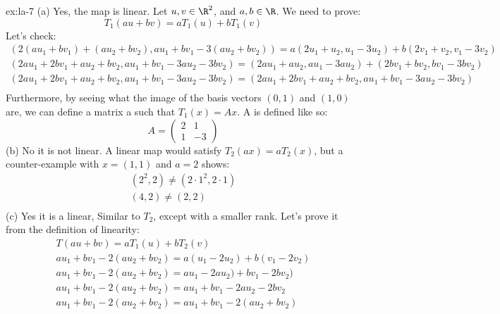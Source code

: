 \begin{solution}{ex:la-7}
  (a) Yes, the map is linear. Let $u,v\in \R^2$, and $a,b\in \R$. We need to prove:
  \[
    T_1(au+bv)=aT_1(u)+bT_1(v)
  \]
  Let's check:
  \[
    \begin{gathered}
      (2(au_1+bv_1)+(au_2+bv_2),au_1+bv_1-3(au_2+bv_2))=a(2u_1+u_2,u_1-3u_2)+b(2v_1+v_2,v_1-3v_2)\\
      (2au_1+2bv_1+au_2+bv_2,au_1+bv_1-3au_2-3bv_2)=(2au_1+au_2,au_1-3au_2)+(2bv_1+bv_2,bv_1-3bv_2)\\
      (2au_1+2bv_1+au_2+bv_2,au_1+bv_1-3au_2-3bv_2)=(2au_1+2bv_1+au_2+bv_2,au_1+bv_1-3au_2-3bv_2)\\
    \end{gathered}
  \]
  Furthermore, by seeing what the image of the basis vectors $(0,1)$ and $(1,0)$ are, we can define a matrix a such that $T_1(x)=Ax$. A is defined like so:
  \[
    A=\begin{pmatrix}2&1\\1&-3\end{pmatrix}
  \]
  (b)
  No it is not linear. A linear map would satisfy $T_2(ax)=aT_2(x)$, but a counter-example with $x=(1,1)$ and $a=2$ shows:
  \[
    \begin{gathered}
      (2^2,2)\neq (2\cdot 1^2,2\cdot 1)\\
      (4,2)\neq (2,2)\\
    \end{gathered}
  \]
  (c)
  Yes it is a linear, Similar to $T_2$, except with a smaller rank. Let's prove it from the definition of linearity:
  \[
    \begin{gathered}
      T(au+bv)=aT_1(u)+bT_2(v)\\
      au_1+bv_1-2(au_2+bv_2)=a(u_1-2u_2)+b(v_1-2v_2)\\
      au_1+bv_1-2(au_2+bv_2)=au_1-2au_2)+bv_1-2bv_2)\\
      au_1+bv_1-2(au_2+bv_2)=au_1+bv_1-2au_2-2bv_2\\
      au_1+bv_1-2(au_2+bv_2)=au_1+bv_1-2(au_2+bv_2)\\
    \end{gathered}
  \]
\end{solution}
